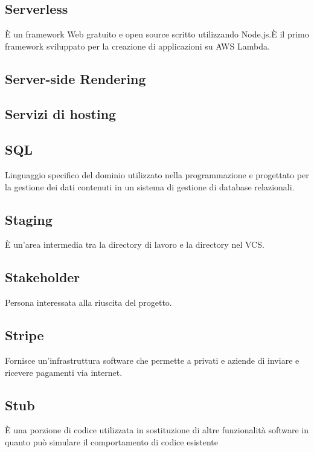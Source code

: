 \section{}
\subsection*{Serverless} È un framework Web gratuito e open source scritto utilizzando Node.js.È il primo framework sviluppato
per la creazione di applicazioni su AWS Lambda.

\subsection*{Server-side Rendering}

\subsection*{Servizi di hosting}

\subsection*{SQL} Linguaggio specifico del dominio utilizzato nella programmazione e progettato per la gestione dei dati
contenuti in un sistema di gestione di database relazionali.

\subsection*{Staging} È un'area intermedia tra la directory di lavoro e la directory nel VCS.

\subsection*{Stakeholder} Persona interessata alla riuscita del progetto.

\subsection*{Stripe} Fornisce un'infrastruttura software che permette a privati e aziende di inviare e ricevere pagamenti via internet.

\subsection*{Stub} È una porzione di codice utilizzata in sostituzione di altre funzionalità software in quanto può simulare il comportamento di codice esistente
\newpage